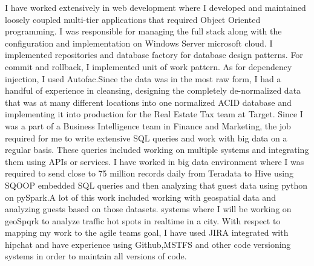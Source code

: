 \documentclass[11pt, a4paper]{awesome-cv}
\begin{document}
\begin{cvletter}
I have worked extensively in web development where I developed and maintained loosely coupled multi-tier applications that required Object Oriented programming. I was responsible for managing the full stack along with the 
configuration and implementation on Windows Server microsoft cloud. I implemented repositories and database factory for database design patterns. For commit and rollback, I implemented unit of work pattern. As for dependency 
injection, I used Autofac.Since the data was in the most raw form, I had a handful of experience in cleansing, designing the completely de-normalized data that was at many different locations into one normalized ACID database and 
implementing it into production for the Real Estate Tax team at Target. 
Since I was a part of a Business Intelligence team in Finance and Marketing, the job required for me to write extensive SQL queries and work with big data on a regular basis. These queries included working on multiple systems and 
integrating them using APIs or services. 
I have worked in big data environment where I was required to send close to 75 million records daily from Teradata to Hive using SQOOP embedded SQL queries and then analyzing that guest data using python on pySpark.A lot of this work 
included working with geospatial data and analyzing guests based on those datasets. 
systems where I will be working on geoSpqrk to analyze traffic hot spots in realtime in a city.
With respect to mapping my work to the agile teams goal, I have used JIRA integrated with hipchat and have experience using Github,MSTFS and other code versioning systems in order to maintain all versions of code.

\end{cvletter}

\makeletterclosing
\end{document}
